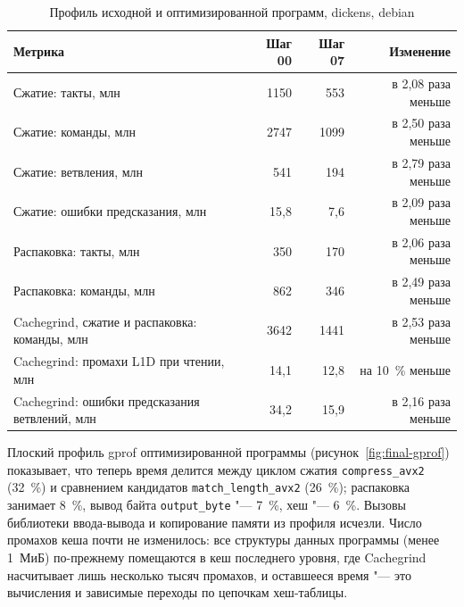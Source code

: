 \begin{table}[H]
\caption{Профиль исходной и оптимизированной программ, dickens, debian}
\label{tab:final-profile}
\begin{tabletext}
\centering
\begin{tabular}{|l|r|r|r|}
\hline
\textbf{Метрика} & \textbf{Шаг 00} & \textbf{Шаг 07} & \textbf{Изменение} \\
\hline
Сжатие: такты, млн & 1150 & 553 & в 2,08 раза меньше \\
Сжатие: команды, млн & 2747 & 1099 & в 2,50 раза меньше \\
Сжатие: ветвления, млн & 541 & 194 & в 2,79 раза меньше \\
Сжатие: ошибки предсказания, млн & 15,8 & 7,6 & в 2,09 раза меньше \\
Распаковка: такты, млн & 350 & 170 & в 2,06 раза меньше \\
Распаковка: команды, млн & 862 & 346 & в 2,49 раза меньше \\
Cachegrind, сжатие и распаковка: команды, млн & 3642 & 1441 & в 2,53 раза меньше \\
Cachegrind: промахи L1D при чтении, млн & 14,1 & 12,8 & на 10~\% меньше \\
Cachegrind: ошибки предсказания ветвлений, млн & 34,2 & 15,9 & в 2,16 раза меньше \\
\hline
\end{tabular}
\end{tabletext}
\end{table}

Плоский профиль gprof оптимизированной программы
(рисунок~\ref{fig:final-gprof}) показывает, что теперь время делится между
циклом сжатия \texttt{compress\_avx2} (32~\%) и сравнением кандидатов
\texttt{match\_length\_avx2} (26~\%); распаковка занимает 8~\%, вывод
байта \texttt{output\_byte} "--- 7~\%, хеш "--- 6~\%. Вызовы библиотеки
ввода-вывода и копирование памяти из профиля исчезли. Число промахов кеша
почти не изменилось: все структуры данных программы (менее 1~МиБ)
по-прежнему помещаются в кеш последнего уровня, где
Cachegrind насчитывает лишь несколько тысяч промахов, и оставшееся время "--- это вычисления и
зависимые переходы по цепочкам хеш-таблицы.


